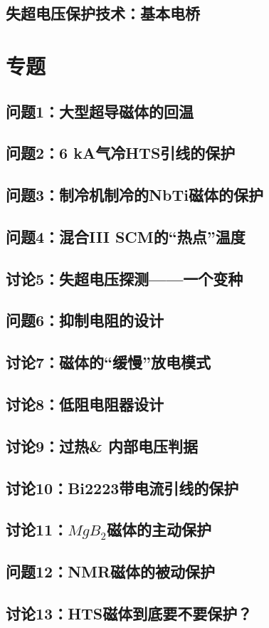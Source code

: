 \subsection{失超电压保护技术：基本电桥}

\section{专题}
\subsection{问题1：大型超导磁体的回温}

\newpage
\subsection{问题2：6 kA气冷HTS引线的保护}

\newpage
\subsection{问题3：制冷机制冷的NbTi磁体的保护}

\newpage
\subsection{问题4：混合III SCM的“热点”温度}

\newpage
\subsection{讨论5：失超电压探测——一个变种}

\newpage
\subsection{问题6：抑制电阻的设计}

\newpage
\subsection{讨论7：磁体的“缓慢”放电模式}

\newpage
\subsection{讨论8：低阻电阻器设计}

\newpage
\subsection{讨论9：过热\& 内部电压判据}

\newpage
\subsection{讨论10：Bi2223带电流引线的保护}

\newpage
\subsection{讨论11：$MgB_2$磁体的主动保护}

\newpage
\subsection{问题12：NMR磁体的被动保护}

\newpage
\subsection{讨论13：HTS磁体到底要不要保护？}
